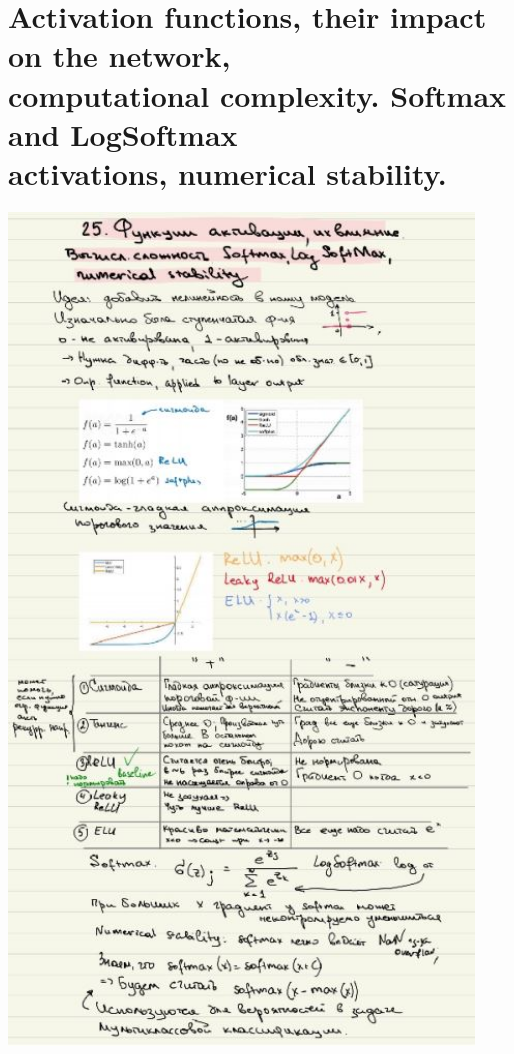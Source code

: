 \section{Activation functions, their impact on the network, \\ computational complexity. Softmax and LogSoftmax \\ activations, numerical stability.}
\includegraphics[width=350pt]{images/25.JPG}
\newpage

